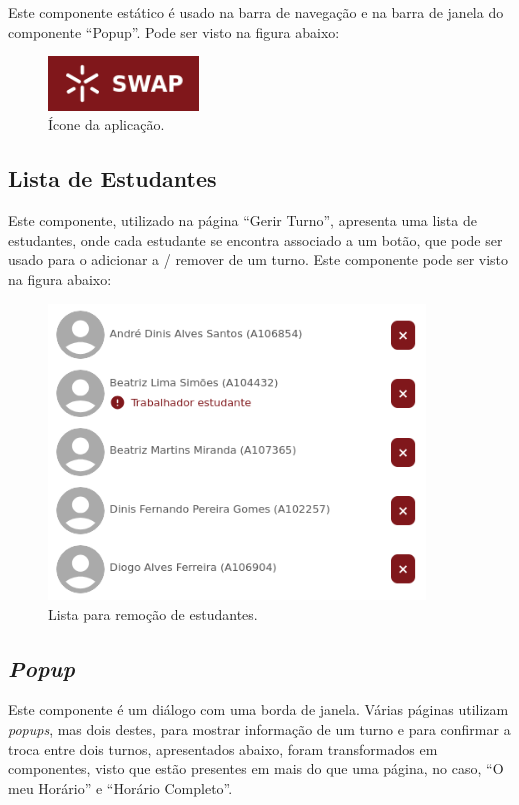 \documentclass[12pt, a4paper]{article}
\begin{document}
Este componente estático é usado na barra de navegação e na barra de janela do componente ``Popup''.
Pode ser visto na figura abaixo:

\begin{figure}[H]
    \centering
    \includegraphics[width=4cm]{res/components/application-icon.png}
    \caption{Ícone da aplicação.}
    \label{application-icon}
\end{figure}

\subsection{Lista de Estudantes}

Este componente, utilizado na página ``Gerir Turno'', apresenta uma lista de estudantes, onde cada
estudante se encontra associado a um botão, que pode ser usado para o adicionar a / remover de um
turno. Este componente pode ser visto na figura abaixo:

\begin{figure}[H]
    \centering
    \includegraphics[width=10cm]{res/components/student-list.png}
    \caption{Lista para remoção de estudantes.}
    \label{student-list}
\end{figure}

\subsection{\emph{Popup}}

Este componente é um diálogo com uma borda de janela. Várias páginas utilizam \emph{popups}, mas
dois destes, para mostrar informação de um turno e para confirmar a troca entre dois turnos,
apresentados abaixo, foram transformados em componentes, visto que estão presentes em mais do que
uma página, no caso, ``O meu Horário'' e ``Horário Completo''.
\end{document}
